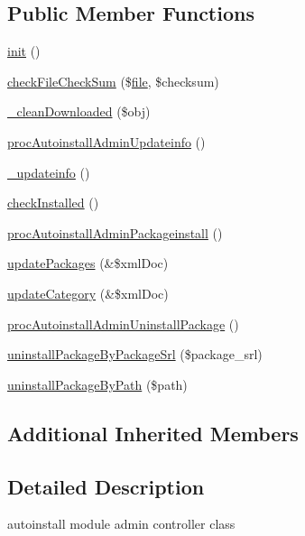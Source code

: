 \subsection*{Public Member Functions}
\begin{DoxyCompactItemize}
\item 
\hyperlink{classautoinstallAdminController_a0679d301d4f5cf35d76a62c4c7584828}{init} ()
\item 
\hyperlink{classautoinstallAdminController_a394c1fc9feab9953cbd5fd54e80c0ff7}{check\+File\+Check\+Sum} (\$\hyperlink{classfile}{file}, \$checksum)
\item 
\hyperlink{classautoinstallAdminController_af921268532a99f4a86c9979212279262}{\+\_\+clean\+Downloaded} (\$obj)
\item 
\hyperlink{classautoinstallAdminController_ac498f2779268ea03dd40799c72af90de}{proc\+Autoinstall\+Admin\+Updateinfo} ()
\item 
\hyperlink{classautoinstallAdminController_ad25ac25ebf81de31754b454b758e7d20}{\+\_\+updateinfo} ()
\item 
\hyperlink{classautoinstallAdminController_a1e6a0964fda3122f0361362af47df1bd}{check\+Installed} ()
\item 
\hyperlink{classautoinstallAdminController_af38130de594cfb4f33b6812a6a9f874d}{proc\+Autoinstall\+Admin\+Packageinstall} ()
\item 
\hyperlink{classautoinstallAdminController_a1e697b55343500fc590a78c93cd8ee54}{update\+Packages} (\&\$xml\+Doc)
\item 
\hyperlink{classautoinstallAdminController_aaf27c70ad29f65b99cb9d80af6376e37}{update\+Category} (\&\$xml\+Doc)
\item 
\hyperlink{classautoinstallAdminController_af289464bb0d9238e82962bd5ce74076f}{proc\+Autoinstall\+Admin\+Uninstall\+Package} ()
\item 
\hyperlink{classautoinstallAdminController_a8e385d2ac38d446a83429c50679e3750}{uninstall\+Package\+By\+Package\+Srl} (\$package\+\_\+srl)
\item 
\hyperlink{classautoinstallAdminController_ac52bb269b9e57d701b176615fa71faa5}{uninstall\+Package\+By\+Path} (\$path)
\end{DoxyCompactItemize}
\subsection*{Additional Inherited Members}


\subsection{Detailed Description}
autoinstall module admin controller class

